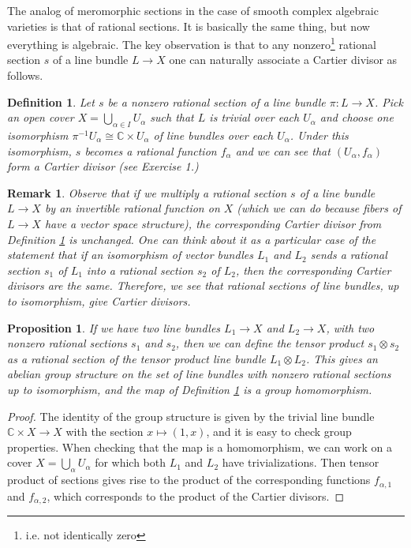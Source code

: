 \documentclass[11pt]{article}
\numberwithin{equation}{section}
\numberwithin{footnote}{section}
\newtheorem{prop}[thm]{Proposition}
\newtheorem{defn}[thm]{Definition}
\newtheorem{rem}[thm]{Remark}
\newcommand{\C}{{\mathbb C}}
\begin{document}
\smallskip
The analog of meromorphic sections in the case of smooth complex algebraic varieties is that of rational sections. It is basically the same thing, but now everything is algebraic. The key observation is that to
any nonzero\footnote{ i.e. not identically zero} rational section $s$ of a line bundle $L\to X$ 
one can naturally associate a Cartier divisor as follows.

\smallskip
\begin{defn}\label{mertoCa}
Let $s$ be a nonzero rational section of a line bundle $\pi:L\to X$. Pick an open cover $X=\bigcup_{\alpha\in I}U_\alpha$ such that $L$ is trivial over each $U_{\alpha}$ and choose one isomorphism $\pi^{-1}U_{\alpha}\cong \C\times U_\alpha$ of line bundles over each $U_\alpha$. Under this isomorphism, $s$ becomes a rational function $f_{\alpha}$ and we can see that 
$(U_\alpha,f_\alpha)$ form a Cartier divisor (see Exercise 1.)
\end{defn}

\smallskip
\begin{rem}
Observe that if we multiply a rational section $s$ of a line bundle $L\to X$ by an invertible rational function on $X$ (which we can do because fibers of $L\to X$ have a vector space structure), the corresponding Cartier divisor from Definition \ref{mertoCa} is unchanged. One can think about it as a particular case of the statement that if an isomorphism of vector bundles $L_1$ and $L_2$ sends a rational section $s_1$ of $L_1$ into a rational section $s_2$ of $L_2$, then the corresponding Cartier divisors are the same. Therefore, we see that rational sections of line bundles, up to isomorphism, give Cartier divisors.
\end{rem}

\smallskip
\begin{prop}
If we have two line bundles $L_1\to X$ and $L_2\to X$, with two nonzero  rational sections $s_1$ and $s_2$, then we can define the tensor product $s_1\otimes s_2$ as a  rational section of the tensor product line bundle $L_1\otimes L_2$. This gives an abelian group structure on the set of line bundles with nonzero  rational sections up to isomorphism, and the map of Definition \ref{mertoCa} is a group homomorphism.
\end{prop}

\begin{proof}
The identity of the group structure is given by the trivial line bundle $\C\times X\to X$ with the section $x\mapsto (1,x)$, and it is easy to check group properties. When checking that the map is a homomorphism, we can work on a cover $X=\bigcup_\alpha U_\alpha$ for which both $L_1$ and $L_2$ have trivializations. Then tensor product of sections gives rise to the product of the corresponding functions $f_{\alpha,1}$ and $f_{\alpha,2}$, which corresponds to the product of the Cartier divisors.
\end{proof}
\end{document}
